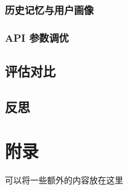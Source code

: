 \documentclass{article}
\theoremstyle{plain}
\theoremstyle{definition}
\theoremstyle{remark}
\begin{document}
\subsubsection{历史记忆与用户画像}

\subsubsection{API 参数调优}


\subsection{评估对比}


\subsection{反思}






\newpage
\appendix
\onecolumn
\section{附录}

可以将一些额外的内容放在这里
\end{document}
